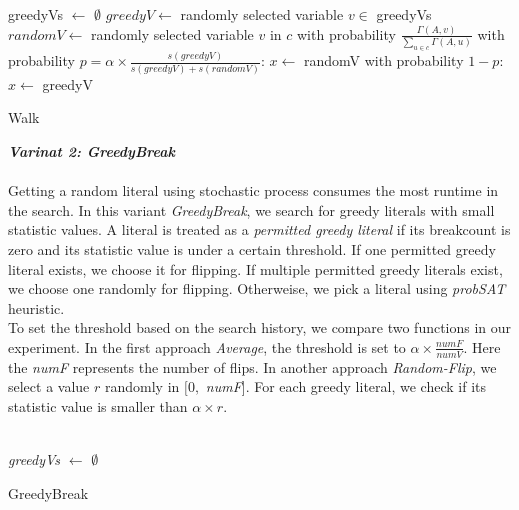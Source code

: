 \documentclass[12pt,a4paper,twoside]{scrartcl}
\numberwithin{equation}{section}
\begin{document}
\begin{algorithm}[H]
 greedyVs $\leftarrow$ $\emptyset$\;
  $greedyV \leftarrow$   randomly selected variable $v \in$ greedyVs \;
  $randomV \leftarrow$ randomly selected  variable $v$ in $c$ with probability $\frac{\Gamma(A,v)}{\sum_{u \in c}\Gamma(A,u)}$\;
  with probability $p = \alpha \times \frac{s(greedyV)}{s(greedyV)+s(randomV)}$: $x\leftarrow$ randomV\;
    with probability $1-p$: $x\leftarrow$ greedyV\;
\caption{Walk}
\end{algorithm} 
\clearpage
 \emph{\textbf{Varinat 2: GreedyBreak}}\\
\\ Getting a random literal using stochastic process consumes the most runtime in the search. In this variant \emph{GreedyBreak}, we search for greedy literals with small statistic values. A literal is treated as  a \emph{permitted greedy literal} if its breakcount is zero and its statistic value is under a certain threshold. If one permitted greedy literal exists, we choose it for flipping. If multiple permitted greedy literals exist, we choose one randomly for flipping. Otherweise, we pick a literal using \emph{probSAT} heuristic.\\ To set the threshold based on the search history, we compare two functions in our experiment. In the first approach \emph{Average}, the threshold is set to $\alpha \times \frac{numF}{numV}$. Here the \emph{numF} represents the number of flips. In another approach \emph{Random-Flip}, we select  a value $r $ randomly in $[0,$  \emph{numF}]. For each greedy literal, we check if its statistic value is smaller than $\alpha \times r$. \\
\\
\begin{algorithm}[H]
  \emph{greedyVs} $\leftarrow$ $\emptyset$\;
  \;
\caption{GreedyBreak}
\end{algorithm} 
\end{document}
